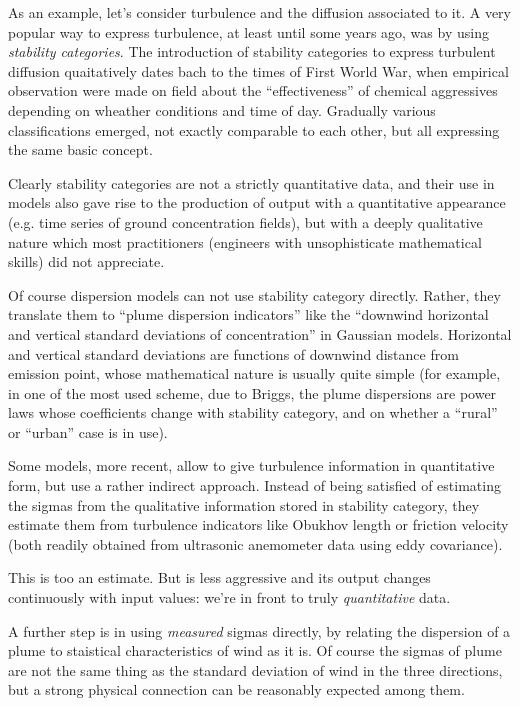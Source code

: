 \documentclass[a4paper,10pt]{book}
\begin{document}
As an example, let's consider turbulence and the diffusion associated to it. A very popular way to express turbulence, at least until some years ago, was by using \emph{stability categories}. The introduction of stability categories to express turbulent diffusion quaitatively dates bach to the times of First World War, when empirical observation were made on field about the ``effectiveness'' of chemical aggressives depending on wheather conditions and time of day. Gradually various classifications emerged, not exactly comparable to each other, but all expressing the same basic concept.

Clearly stability categories are not a strictly quantitative data, and their use in models also gave rise to the production of output with a quantitative appearance (e.g. time series of ground concentration fields), but with a deeply qualitative nature which most practitioners (engineers with unsophisticate mathematical skills) did not appreciate.

Of course dispersion models can not use stability category directly. Rather, they translate them to ``plume dispersion indicators'' like the ``downwind horizontal and vertical standard deviations of concentration'' in Gaussian models. Horizontal and vertical standard deviations are functions of downwind distance from emission point, whose mathematical nature is usually quite simple (for example, in one of the most used scheme, due to Briggs, the plume dispersions are power laws whose coefficients change with stability category, and on whether a ``rural'' or ``urban'' case is in use).

Some models, more recent, allow to give turbulence information in quantitative form, but use a rather indirect approach. Instead of being satisfied of estimating the sigmas from the qualitative information stored in stability category, they estimate them from turbulence indicators like Obukhov length or friction velocity (both readily obtained from ultrasonic anemometer data using eddy covariance).

This is too an estimate. But is less aggressive and its output changes continuously with input values: we're in front to truly \emph{quantitative} data.

A further step is in using \emph{measured} sigmas directly, by relating the dispersion of a plume to staistical characteristics of wind as it is. Of course the sigmas of plume are not the same thing as the standard deviation of wind in the three directions, but a strong physical connection can be reasonably expected among them. 
\end{document}
